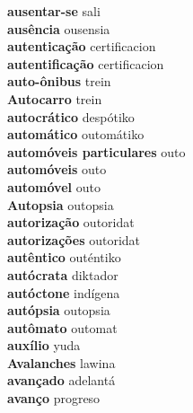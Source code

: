 \textbf{ ausentar-se  } sali \\
\textbf{ ausência  } ousensia \\
\textbf{ autenticação  } certificacion \\
\textbf{ autentificação  } certificacion \\
\textbf{ auto-ônibus  } trein \\
\textbf{ Autocarro  } trein \\
\textbf{ autocrático  } despótiko \\
\textbf{ automático  } outomátiko \\
\textbf{ automóveis particulares  } outo \\
\textbf{ automóveis  } outo \\
\textbf{ automóvel  } outo \\
\textbf{ Autopsia  } outopsia \\
\textbf{ autorização  } outoridat \\
\textbf{ autorizações  } outoridat \\
\textbf{ autêntico  } outéntiko \\
\textbf{ autócrata  } diktador \\
\textbf{ autóctone  } indígena \\
\textbf{ autópsia  } outopsia \\
\textbf{ autômato  } outomat \\
\textbf{ auxílio  } yuda \\
\textbf{ Avalanches  } lawina \\
\textbf{ avançado  } adelantá \\
\textbf{ avanço  } progreso \\
